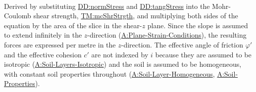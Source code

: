 \documentclass[12pt]{article}
\begin{document}
\paragraph{}
\label{GD:resShrDeriv}
Derived by substituting \hyperref[DD:normStress]{DD:normStress} and \hyperref[DD:tangStress]{DD:tangStress} into the Mohr-Coulomb shear strength, \hyperref[TM:mcShrStrgth]{TM:mcShrStrgth}, and multiplying both sides of the equation by the area of the slice in the shear-$z$ plane. Since the slope is assumed to extend infinitely in the $z$-direction (\hyperref[assumpPSC]{A:Plane-Strain-Conditions}), the resulting forces are expressed per metre in the $z$-direction. The effective angle of friction $φ'$ and the effective cohesion $c'$ are not indexed by $i$ because they are assumed to be isotropic (\hyperref[assumpSLI]{A:Soil-Layers-Isotropic}) and the soil is assumed to be homogeneous, with constant soil properties throughout (\hyperref[assumpSLH]{A:Soil-Layer-Homogeneous}, \hyperref[assumpSP]{A:Soil-Properties}).
\end{document}
